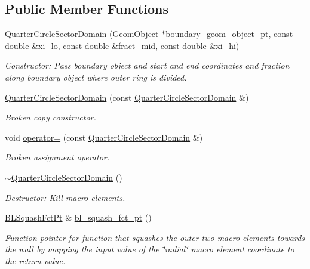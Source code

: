 \subsection*{Public Member Functions}
\begin{DoxyCompactItemize}
\item 
\hyperlink{classoomph_1_1QuarterCircleSectorDomain_accee19bdd94e0e3fe0d7c347ede685de}{Quarter\+Circle\+Sector\+Domain} (\hyperlink{classoomph_1_1GeomObject}{Geom\+Object} $\ast$boundary\+\_\+geom\+\_\+object\+\_\+pt, const double \&xi\+\_\+lo, const double \&fract\+\_\+mid, const double \&xi\+\_\+hi)
\begin{DoxyCompactList}\small\item\em Constructor\+: Pass boundary object and start and end coordinates and fraction along boundary object where outer ring is divided. \end{DoxyCompactList}\item 
\hyperlink{classoomph_1_1QuarterCircleSectorDomain_a08d26f31016ef7b40e6bdadfc1eee29a}{Quarter\+Circle\+Sector\+Domain} (const \hyperlink{classoomph_1_1QuarterCircleSectorDomain}{Quarter\+Circle\+Sector\+Domain} \&)
\begin{DoxyCompactList}\small\item\em Broken copy constructor. \end{DoxyCompactList}\item 
void \hyperlink{classoomph_1_1QuarterCircleSectorDomain_a13bb4a1ac04f99ded56c398474676ce1}{operator=} (const \hyperlink{classoomph_1_1QuarterCircleSectorDomain}{Quarter\+Circle\+Sector\+Domain} \&)
\begin{DoxyCompactList}\small\item\em Broken assignment operator. \end{DoxyCompactList}\item 
\hyperlink{classoomph_1_1QuarterCircleSectorDomain_aea4997af819b532c8d8588123785950a}{$\sim$\+Quarter\+Circle\+Sector\+Domain} ()
\begin{DoxyCompactList}\small\item\em Destructor\+: Kill macro elements. \end{DoxyCompactList}\item 
\hyperlink{classoomph_1_1QuarterCircleSectorDomain_a6cffab57f87c9f4ab01744647240bb1e}{B\+L\+Squash\+Fct\+Pt} \& \hyperlink{classoomph_1_1QuarterCircleSectorDomain_ad8f22c0c3dc71c104465a24dac9b7c17}{bl\+\_\+squash\+\_\+fct\+\_\+pt} ()
\begin{DoxyCompactList}\small\item\em Function pointer for function that squashes the outer two macro elements towards the wall by mapping the input value of the \char`\"{}radial\char`\"{} macro element coordinate to the return value. \end{DoxyCompactList}\item 

\end{DoxyCompactItemize}
